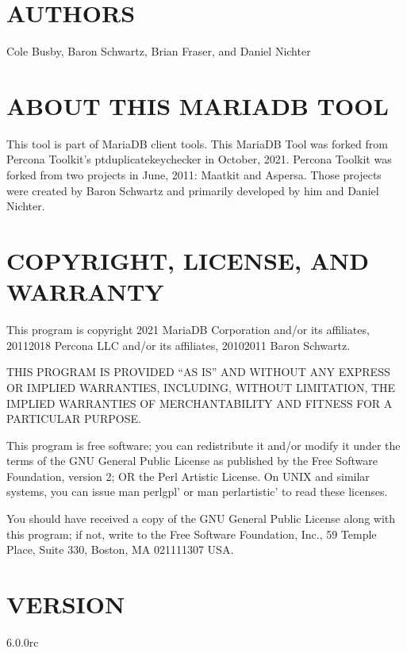 \documentclass[letterpaper,10pt,english]{sphinxmanual}
\begin{document}
\section{AUTHORS}
\label{\detokenize{mariadb-index-checker:authors}}
Cole Busby, Baron Schwartz, Brian Fraser, and Daniel Nichter


\section{ABOUT THIS MARIADB TOOL}
\label{\detokenize{mariadb-index-checker:about-this-mariadb-tool}}
This tool is part of MariaDB client tools. This MariaDB Tool was forked from
Percona Toolkit’s pt\sphinxhyphen{}duplicate\sphinxhyphen{}key\sphinxhyphen{}checker in October, 2021. Percona Toolkit
was forked from two projects in June, 2011: Maatkit and Aspersa.
Those projects were created by Baron Schwartz and primarily developed by him
and Daniel Nichter.


\section{COPYRIGHT, LICENSE, AND WARRANTY}
\label{\detokenize{mariadb-index-checker:copyright-license-and-warranty}}
This program is copyright 2021 MariaDB Corporation and/or its affiliates,
2011\sphinxhyphen{}2018 Percona LLC and/or its affiliates, 2010\sphinxhyphen{}2011 Baron Schwartz.

THIS PROGRAM IS PROVIDED “AS IS” AND WITHOUT ANY EXPRESS OR IMPLIED
WARRANTIES, INCLUDING, WITHOUT LIMITATION, THE IMPLIED WARRANTIES OF
MERCHANTABILITY AND FITNESS FOR A PARTICULAR PURPOSE.

This program is free software; you can redistribute it and/or modify it under
the terms of the GNU General Public License as published by the Free Software
Foundation, version 2; OR the Perl Artistic License.  On UNIX and similar
systems, you can issue \textasciigrave{}man perlgpl’ or \textasciigrave{}man perlartistic’ to read these
licenses.

You should have received a copy of the GNU General Public License along with
this program; if not, write to the Free Software Foundation, Inc., 59 Temple
Place, Suite 330, Boston, MA  02111\sphinxhyphen{}1307  USA.


\section{VERSION}
\label{\detokenize{mariadb-index-checker:version}}
 6.0.0rc
\end{document}
